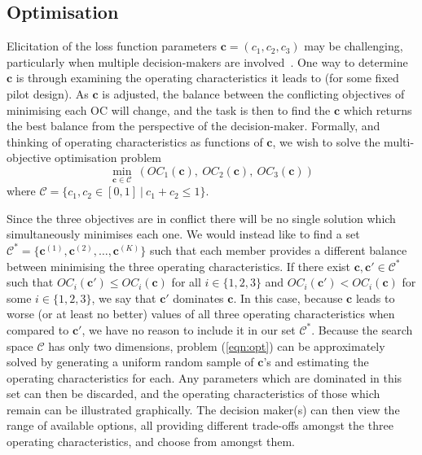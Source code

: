 \documentclass[AMA,STIX1COL]{WileyNJD-v2}
\begin{document}
\subsection{Optimisation}\label{sec:optimisation}

Elicitation of the loss function parameters $\mathbf{c} = (c_1, c_2, c_3)$ may be challenging, particularly when multiple decision-makers are involved~\cite{Keeney1976}. One way to determine $\mathbf{c}$ is through examining the operating characteristics it leads to (for some fixed pilot design). As $\mathbf{c}$ is adjusted, the balance between the conflicting objectives of minimising each OC will change, and the task is then to find the $\mathbf{c}$ which returns the best balance from the perspective of the decision-maker. Formally, and thinking of operating characteristics as functions of $\mathbf{c}$, we wish to solve the multi-objective optimisation problem
\begin{equation}\label{eqn:opt}
\min_{\mathbf{c} \in \mathcal{C}} ~ \left( OC_{1}(\mathbf{c}),~ OC_{2}(\mathbf{c}),~ OC_{3}(\mathbf{c}) \right)
\end{equation}
where $\mathcal{C} = \{c_{1}, c_{2} \in [0,1] ~|~ c_{1} + c_{2} \leq 1\}$. 

Since the three objectives are in conflict there will be no single solution which simultaneously minimises each one. We would instead like to find a set $\mathcal{C}^* = \{ \mathbf{c}^{(1)}, \mathbf{c}^{(2)}, \ldots, \mathbf{c}^{(K)} \}$ such that each member provides a different balance between minimising the three operating characteristics. If there exist $\mathbf{c}, \mathbf{c}' \in \mathcal{C}^*$ such that $OC_i(\mathbf{c}') \leq OC_i(\mathbf{c})$ for all $i \in \{1, 2, 3\}$ and $OC_i(\mathbf{c}') < OC_i(\mathbf{c})$ for some $i \in \{1, 2, 3\}$, we say that $\mathbf{c}'$ dominates $\mathbf{c}$. In this case, because $\mathbf{c}$ leads to worse (or at least no better) values of all three operating characteristics when compared to $\mathbf{c}'$, we have no reason to include it in our set $\mathcal{C}^*$. Because the search space $\mathcal{C}$ has only two dimensions, problem (\ref{eqn:opt}) can be approximately solved by generating a uniform random sample of $\mathbf{c}$'s and estimating the operating characteristics for each. Any parameters which are dominated in this set can then be discarded, and the operating characteristics of those which remain can be illustrated graphically. The decision maker(s) can then view the range of available options, all providing different trade-offs amongst the three operating characteristics, and choose from amongst them. 
\end{document}
